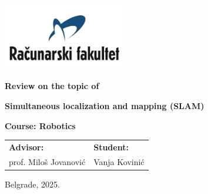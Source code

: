 \documentclass[12pt]{article}
\begin{document}

\begin{titlepage}
    \begin{center}
        
        \vspace*{-1in}
        \includegraphics[width=0.4\textwidth]{raf_logo.png}

        \vspace{1in}
        \Large
        \textbf{Review on the topic of}
        
        \vspace{1in}
        \Huge
        \textbf{Simultaneous localization and mapping (SLAM)}
        
        \vspace{1in}


            \fontsize{17pt}{17pt}\selectfont
            \textbf{Course: Robotics} \\
            \vspace*{1.5in}
            
            \begin{center}
            \normalsize
            \begin{tabular}{p{} p{}}
                \fontsize{14pt}{18pt}\selectfont   
                \textbf{Advisor:} & 
            
                \fontsize{14pt}{18pt}\selectfont
                \textbf{Student:} \\
                prof. Miloš Jovanović & Vanja Kovinić \\
            \end{tabular}
            \end{center}

            \vspace*{\fill}

            \normalsize
            Belgrade, 2025.


            
        \end{center}
    \end{titlepage}
    \restoregeometry %
\end{document}
